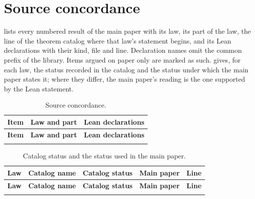 \section{Source concordance}
\label{supp:concordance}

 lists every numbered result of the main paper with its law, its part of the
law, the line of the theorem catalog where that law's statement begins, and its Lean declarations
with their kind, file and line. Declaration names omit the common prefix of the library. Items argued on paper only are marked as such.
 gives, for each law, the status recorded in the catalog and the status
under which the main paper states it; where they differ, the main paper's reading is the one
supported by the Lean statement.

{\scriptsize
\begin{longtable}{@{}l>{\raggedright\arraybackslash}p{2.6cm}>{\raggedright\arraybackslash}p{10.4cm}@{}}
\caption{Source concordance.}\label{tab:concordance}\\
\toprule
\textbf{Item} & \textbf{Law and part} & \textbf{Lean declarations} \\
\midrule
\endfirsthead
\toprule
\textbf{Item} & \textbf{Law and part} & \textbf{Lean declarations} \\
\midrule
\endhead
\bottomrule
\endfoot

\end{longtable}
}

{\small
\begin{longtable}{@{}l>{\raggedright\arraybackslash}p{4.4cm}>{\raggedright\arraybackslash}p{3.2cm}>{\raggedright\arraybackslash}p{3.8cm}r@{}}
\caption{Catalog status and the status used in the main paper.}\label{tab:catalog-index}\\
\toprule
\textbf{Law} & \textbf{Catalog name} & \textbf{Catalog status} & \textbf{Main paper} & \textbf{Line} \\
\midrule
\endfirsthead
\toprule
\textbf{Law} & \textbf{Catalog name} & \textbf{Catalog status} & \textbf{Main paper} & \textbf{Line} \\
\midrule
\endhead
\bottomrule
\endfoot

\end{longtable}
}

